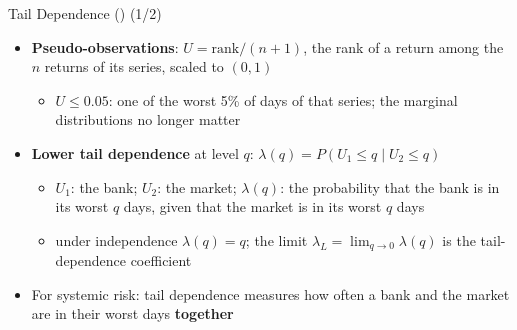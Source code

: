 \begin{frame}{Tail Dependence () (1/2)}
\itemsize{\small}
\begin{itemize}
    \item \textbf{Pseudo-observations}: $U = \text{rank}/(n + 1)$, the rank of a return among the $n$ returns of its series, scaled to $(0, 1)$
    \begin{itemize}
        \item $U \le 0.05$: one of the worst 5\% of days of that series; the marginal distributions no longer matter
    \end{itemize}
    \item \textbf{Lower tail dependence} at level $q$: $\lambda(q) = P(U_1 \le q \mid U_2 \le q)$
    \begin{itemize}
        \item $U_1$: the bank; $U_2$: the market; $\lambda(q)$: the probability that the bank is in its worst $q$ days, given that the market is in its worst $q$ days
        \item under independence $\lambda(q) = q$; the limit $\lambda_L = \lim_{q \to 0}\lambda(q)$ is the tail-dependence coefficient
    \end{itemize}
    \item For systemic risk: tail dependence measures how often a bank and the market are in their worst days \textbf{together}
\end{itemize}
\end{frame}

